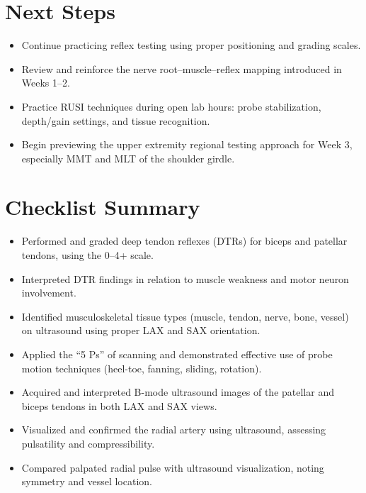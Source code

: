 \section*{Next Steps}

\begin{itemize}
  \item Continue practicing reflex testing using proper positioning and grading scales.
  \item Review and reinforce the nerve root–muscle–reflex mapping introduced in Weeks 1–2.
  \item Practice RUSI techniques during open lab hours: probe stabilization, depth/gain settings, and tissue recognition.
  \item Begin previewing the upper extremity regional testing approach for Week 3, especially MMT and MLT of the shoulder girdle.
\end{itemize}

\section*{Checklist Summary}

\begin{itemize}
  \item [$\square$] Performed and graded deep tendon reflexes (DTRs) for biceps and patellar tendons, using the 0–4+ scale.
  \item [$\square$] Interpreted DTR findings in relation to muscle weakness and motor neuron involvement.
  \item [$\square$] Identified musculoskeletal tissue types (muscle, tendon, nerve, bone, vessel) on ultrasound using proper LAX and SAX orientation.
  \item [$\square$] Applied the “5 Ps” of scanning and demonstrated effective use of probe motion techniques (heel-toe, fanning, sliding, rotation).
  \item [$\square$] Acquired and interpreted B-mode ultrasound images of the patellar and biceps tendons in both LAX and SAX views.
  \item [$\square$] Visualized and confirmed the radial artery using ultrasound, assessing pulsatility and compressibility.
  \item [$\square$] Compared palpated radial pulse with ultrasound visualization, noting symmetry and vessel location.
\end{itemize}

